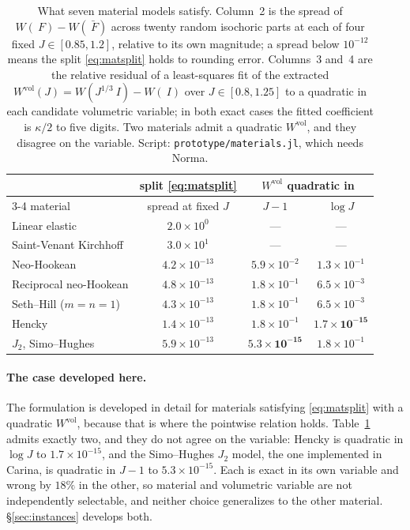 \documentclass[11pt]{article}
\newcommand{\F}{~F}
\newcommand{\Id}{~I}
\newcommand{\supvol}{^{\mathrm{vol}}}
\newcommand{\code}[1]{\texttt{#1}}
\theoremstyle{definition}
\theoremstyle{plain}
\begin{document}
\begin{table}[tbp]
  \centering
  \caption{What seven material models satisfy. Column~2 is the
  spread of $W(\F) - W(\bar{\F})$ across twenty random isochoric parts at each
  of four fixed $J \in [0.85, 1.2]$, relative to its own magnitude; a spread
  below $10^{-12}$ means the split \eqref{eq:matsplit} holds to rounding
  error. Columns~3 and~4 are the
  relative residual of a least-squares fit of the extracted $W\supvol(J) =
  W(J^{1/3}\Id) - W(\Id)$ over $J \in [0.8, 1.25]$ to a quadratic in each
  candidate volumetric variable; in both exact cases the fitted coefficient is
  $\kappa/2$ to five digits. Two materials admit a quadratic $W\supvol$, and
  they disagree on the variable. Script: \code{prototype/materials.jl}, which
  needs Norma.}
  \label{tab:split}
  \begin{tabular}{lccc}
    \toprule
    & split \eqref{eq:matsplit} & \multicolumn{2}{c}{$W\supvol$ quadratic in} \\
    \cmidrule(lr){3-4}
    material & spread at fixed $J$ & $J - 1$ & $\log J$ \\
    \midrule
    Linear elastic              & $2.0\times10^{0}$   & ---                 & ---                 \\
    Saint-Venant Kirchhoff      & $3.0\times10^{1}$   & ---                 & ---                 \\
    Neo-Hookean                 & $4.2\times10^{-13}$ & $5.9\times10^{-2}$  & $1.3\times10^{-1}$  \\
    Reciprocal neo-Hookean      & $4.8\times10^{-13}$ & $1.8\times10^{-1}$  & $6.5\times10^{-3}$  \\
    Seth--Hill ($m = n = 1$)    & $4.3\times10^{-13}$ & $1.8\times10^{-1}$  & $6.5\times10^{-3}$  \\
    Hencky                      & $1.4\times10^{-13}$ & $1.8\times10^{-1}$  & $\mathbf{1.7\times10^{-15}}$ \\
    $J_2$, Simo--Hughes         & $5.9\times10^{-13}$ & $\mathbf{5.3\times10^{-15}}$ & $1.8\times10^{-1}$  \\
    \bottomrule
  \end{tabular}
\end{table}

\paragraph{The case developed here.} The formulation is developed in detail
for materials satisfying \eqref{eq:matsplit} with a quadratic
$W\supvol$, because that is where the pointwise relation holds.
Table~\ref{tab:split} admits exactly two, and they do
not agree on the variable: Hencky is quadratic in $\log J$ to
$1.7\times10^{-15}$, and the Simo--Hughes $J_2$ model, the one implemented
in Carina, is quadratic in $J-1$ to $5.3\times10^{-15}$. Each is exact in its
own variable and wrong by $18\%$ in the other, so material and volumetric
variable are not independently selectable, and neither choice generalizes to
the other material. \S\ref{sec:instances} develops both.
\end{document}
